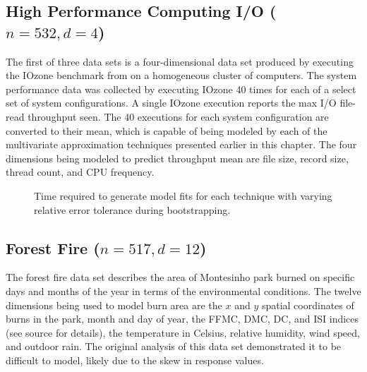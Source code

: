 \subsection{High Performance Computing I/O ($n = 532, d = 4$)}
The first of three data sets is a four-dimensional data set produced by executing the IOzone benchmark from \cite{iozone} on a homogeneous cluster of computers. The system performance data was collected by executing IOzone 40 times for each of a select set of system configurations. A single IOzone execution reports the max I/O file-read throughput seen. The 40 executions for each system configuration are converted to their mean, which is capable of being modeled by each of the multivariate approximation techniques presented earlier in this chapter. The four dimensions being modeled to predict throughput mean are file size, record size, thread count, and CPU frequency.

\begin{figure}[htb]
  \centering
  \caption{Time required to generate model fits for each technique with varying relative error tolerance during bootstrapping.
    \vspace{-.3cm}}
  \label{fig_eval_times}
\end{figure}

\subsection{Forest Fire ($n = 517, d = 12$)}
The forest fire data set \cite{cortez2007data} describes the area of Montesinho park burned on specific days and months of the year in terms of the environmental conditions. The twelve dimensions being used to model burn area are the $x$ and $y$ spatial coordinates of burns in the park, month and day of year, the FFMC, DMC, DC, and ISI indices (see source for details), the temperature in Celsius, relative humidity, wind speed, and outdoor rain. The original analysis of this data set demonstrated it to be difficult to model, likely due to the skew in response values.

